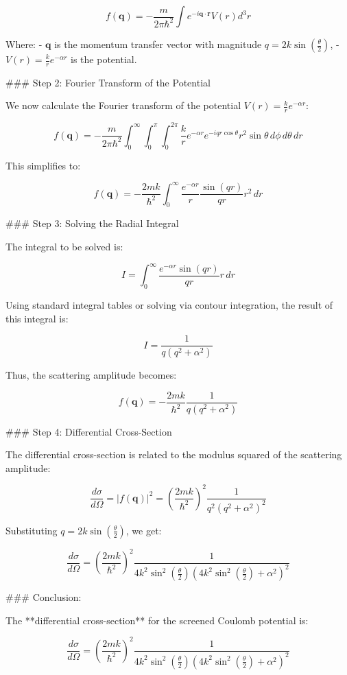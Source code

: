 \[
f(\mathbf{q}) = -\frac{m}{2\pi \hbar^2} \int e^{-i\mathbf{q} \cdot \mathbf{r}} V(r) d^3r
\]

Where:
- \( \mathbf{q} \) is the momentum transfer vector with magnitude \( q = 2k \sin\left(\frac{\theta}{2}\right) \),
- \( V(r) = \frac{k}{r} e^{-\alpha r} \) is the potential.

### Step 2: Fourier Transform of the Potential

We now calculate the Fourier transform of the potential \( V(r) = \frac{k}{r} e^{-\alpha r} \):

\[
f(\mathbf{q}) = -\frac{m}{2\pi \hbar^2} \int_0^\infty \int_0^\pi \int_0^{2\pi} \frac{k}{r} e^{-\alpha r} e^{-i q r \cos\theta} r^2 \sin\theta \, d\phi \, d\theta \, dr
\]

This simplifies to:

\[
f(\mathbf{q}) = -\frac{2mk}{\hbar^2} \int_0^\infty \frac{e^{-\alpha r}}{r} \frac{\sin(qr)}{qr} r^2 \, dr
\]

### Step 3: Solving the Radial Integral

The integral to be solved is:

\[
I = \int_0^\infty \frac{e^{-\alpha r} \sin(qr)}{qr} r \, dr
\]

Using standard integral tables or solving via contour integration, the result of this integral is:

\[
I = \frac{1}{q(q^2 + \alpha^2)}
\]

Thus, the scattering amplitude becomes:

\[
f(\mathbf{q}) = -\frac{2mk}{\hbar^2} \frac{1}{q(q^2 + \alpha^2)}
\]

### Step 4: Differential Cross-Section

The differential cross-section is related to the modulus squared of the scattering amplitude:

\[
\frac{d\sigma}{d\Omega} = |f(\mathbf{q})|^2 = \left( \frac{2mk}{\hbar^2} \right)^2 \frac{1}{q^2 (q^2 + \alpha^2)^2}
\]

Substituting \( q = 2k \sin\left(\frac{\theta}{2}\right) \), we get:

\[
\frac{d\sigma}{d\Omega} = \left( \frac{2mk}{\hbar^2} \right)^2 \frac{1}{4k^2 \sin^2\left(\frac{\theta}{2}\right) \left( 4k^2 \sin^2\left(\frac{\theta}{2}\right) + \alpha^2 \right)^2}
\]

### Conclusion:

The **differential cross-section** for the screened Coulomb potential is:

\[
\frac{d\sigma}{d\Omega} = \left( \frac{2mk}{\hbar^2} \right)^2 \frac{1}{4k^2 \sin^2\left(\frac{\theta}{2}\right) \left( 4k^2 \sin^2\left(\frac{\theta}{2}\right) + \alpha^2 \right)^2}
\]

